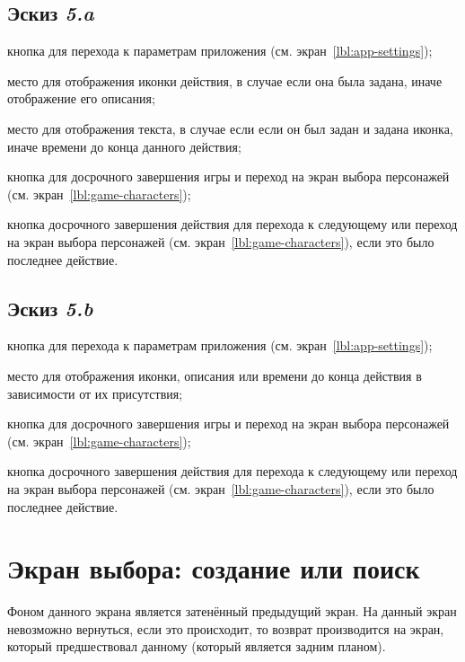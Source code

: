 \subsection{Эскиз \emph{5.a}}

\begin{enumerate*}
    \item кнопка для перехода к параметрам приложения (см. экран~\ref{lbl:app-settings});
    \item место для отображения иконки действия, в случае если она была задана, иначе отображение его описания;
    \item место для отображения текста, в случае если если он был задан и задана иконка, иначе времени до конца данного действия;
    \item кнопка для досрочного завершения игры и переход на экран выбора персонажей (см. экран~\ref{lbl:game-characters});
    \item кнопка досрочного завершения действия для перехода к следующему или переход на экран выбора персонажей (см. экран~\ref{lbl:game-characters}), если это было последнее действие.
\end{enumerate*}

\subsection{Эскиз \emph{5.b}}

\begin{enumerate*}
    \item кнопка для перехода к параметрам приложения (см. экран~\ref{lbl:app-settings});
    \item место для отображения иконки, описания или времени до конца действия в зависимости от их присутствия;
    \item кнопка для досрочного завершения игры и переход на экран выбора персонажей (см. экран~\ref{lbl:game-characters});
    \item кнопка досрочного завершения действия для перехода к следующему или переход на экран выбора персонажей (см. экран~\ref{lbl:game-characters}), если это было последнее действие.
\end{enumerate*}

\section{Экран выбора: создание или поиск}\label{lbl:choose}

Фоном данного экрана является затенённый предыдущий экран. На данный экран невозможно вернуться, если это происходит, то возврат производится на экран, который предшествовал данному (который является задним планом).

